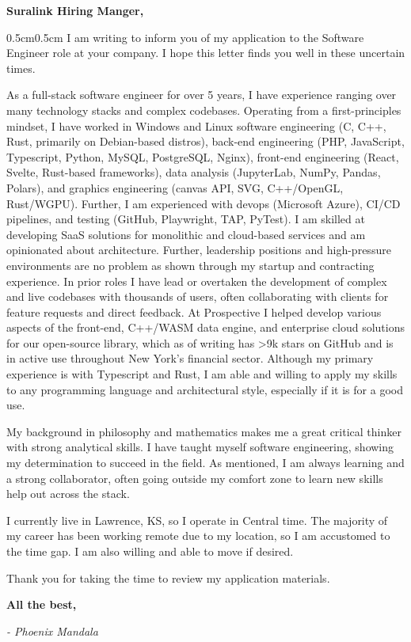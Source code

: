 \documentclass[10pt, letterpaper]{article}
\begin{document}
	\begin{doublespace}
		\noindent
		\textbf{Suralink Hiring Manger,}

		\begin{adjustwidth}
			{0.5cm}{0.5cm} I am writing to inform you of my application to the
			Software Engineer role at your company. I hope this letter finds you well in
			these uncertain times.

			As a full-stack software engineer for over 5 years, I have experience
			ranging over many technology stacks and complex codebases. Operating from a
			first-principles mindset, I have worked in Windows and Linux software
			engineering (C, C++, Rust, primarily on Debian-based distros), back-end
			engineering (PHP, JavaScript, Typescript, Python, MySQL, PostgreSQL, Nginx),
			front-end engineering (React, Svelte, Rust-based frameworks), data
			analysis (JupyterLab, NumPy, Pandas, Polars), and graphics engineering (canvas
			API, SVG, C++/OpenGL, Rust/WGPU). Further, I am experienced with devops (Microsoft
			Azure), CI/CD pipelines, and testing (GitHub, Playwright, TAP, PyTest). I am
			skilled at developing SaaS solutions for monolithic and cloud-based services
			and am opinionated about architecture. Further, leadership positions and high-pressure
			environments are no problem as shown through my startup and contracting experience.
			In prior roles I have lead or overtaken the development of complex and
			live codebases with thousands of users, often collaborating with clients for
			feature requests and direct feedback. At Prospective I helped develop
			various aspects of the front-end, C++/WASM data engine, and enterprise
			cloud solutions for our open-source library, which as of writing has >9k
			stars on GitHub and is in active use throughout New York's financial
			sector. Although my primary experience is with Typescript and Rust, I am
			able and willing to apply my skills to any programming language and
			architectural style, especially if it is for a good use.

			My background in philosophy and mathematics makes me a great critical thinker
			with strong analytical skills. I have taught myself software engineering, showing
			my determination to succeed in the field. As mentioned, I am always learning
			and a strong collaborator, often going outside my comfort zone to learn
			new skills help out across the stack.

			I currently live in Lawrence, KS, so I operate in Central time. The majority
			of my career has been working remote due to my location, so I am
			accustomed to the time gap. I am also willing and able to move if desired.

			Thank you for taking the time to review my application materials.
		\end{adjustwidth}

		\noindent
		\textbf{All the best,}

		\noindent
		\textit{- Phoenix Mandala}
	\end{doublespace}
\end{document}
